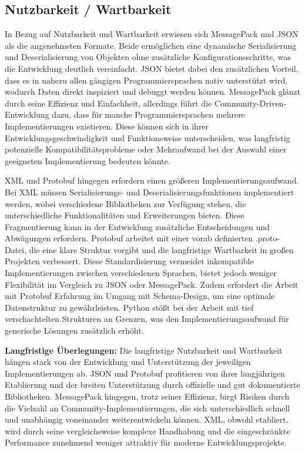 \documentclass[ngerman]{seminarvorlage}
\begin{document}
\subsection{Nutzbarkeit / Wartbarkeit}
In Bezug auf Nutzbarkeit und Wartbarkeit erwiesen sich MessagePack und JSON als die angenehmsten Formate. Beide ermöglichen eine dynamische Serialisierung und Deserialisierung von Objekten ohne zusätzliche Konfigurationsschritte, was die Entwicklung deutlich vereinfacht. JSON bietet dabei den zusätzlichen Vorteil, dass es in nahezu allen gängigen Programmiersprachen nativ unterstützt wird, wodurch Daten direkt inspiziert und debuggt werden können. MessagePack glänzt durch seine Effizienz und Einfachheit, allerdings führt die Community-Driven-Entwicklung dazu, dass für manche Programmiersprachen mehrere Implementierungen existieren. Diese können sich in ihrer Entwicklungsgeschwindigkeit und Funktionsweise unterscheiden, was langfristig potenzielle Kompatibilitätsprobleme oder Mehraufwand bei der Auswahl einer geeigneten Implementierung bedeuten könnte.

\newpage
XML und Protobuf hingegen erfordern einen größeren Implementierungsaufwand. Bei XML müssen Serialisierungs- und Deserialisierungsfunktionen implementiert werden, wobei verschiedene Bibliotheken zur Verfügung stehen, die unterschiedliche Funktionalitäten und Erweiterungen bieten. Diese Fragmentierung kann in der Entwicklung zusätzliche Entscheidungen und Abwägungen erfordern. Protobuf arbeitet mit einer vorab definierten .proto-Datei, die eine klare Struktur vorgibt und die langfristige Wartbarkeit in großen Projekten verbessert. Diese Standardisierung vermeidet inkompatible Implementierungen zwischen verschiedenen Sprachen, bietet jedoch weniger Flexibilität im Vergleich zu JSON oder MessagePack. Zudem erfordert die Arbeit mit Protobuf Erfahrung im Umgang mit Schema-Design, um eine optimale Datenstruktur zu gewährleisten. Python stößt bei der Arbeit mit tief verschachtelten Strukturen an Grenzen, was den Implementierungsaufwand für generische Lösungen zusätzlich erhöht.

\textbf{Langfristige Überlegungen:}
Die langfristige Nutzbarkeit und Wartbarkeit hängen stark von der Entwicklung und Unterstützung der jeweiligen Implementierungen ab. JSON und Protobuf profitieren von ihrer langjährigen Etablierung und der breiten Unterstützung durch offizielle und gut dokumentierte Bibliotheken. MessagePack hingegen, trotz seiner Effizienz, birgt Risiken durch die Vielzahl an Community-Implementierungen, die sich unterschiedlich schnell und unabhängig voneinander weiterentwickeln können. XML, obwohl etabliert, wird durch seine vergleichsweise komplexe Handhabung und die eingeschränkte Performance zunehmend weniger attraktiv für moderne Entwicklungsprojekte.
\end{document}
